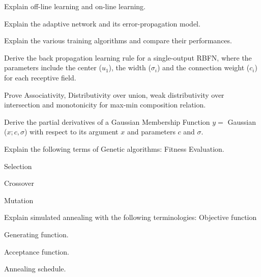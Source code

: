 \newpage \again

\item \iitem Explain off-line learning and on-line learning.
\item Explain the adaptive network and its error-propagation model.
\ene
\ene

\item \iitem Explain the various training algorithms and compare their
  performances.
\Or
\item Derive the back propagation learning rule for a single-output RBFN,
  where the parameters include the center ($u_1$), the width ($\sigma_i$)
  and the connection weight ($c_i$) for each receptive field.
\ene

\item \iitem Prove Associativity, Distributivity over union, weak distributivity
  over intersection and monotonicity for max-min composition relation.
\Or
\item Derive the partial derivatives of a Gaussian Membership Function
  $y =$ Gaussian ($x; c, \sigma$) with respect to its argument $x$ and
  parameters $c$ and $\sigma$.
\ene

\item \iitem Explain the following terms of Genetic algorithms:
\iitem Fitness Evaluation.
\item Selection
\item Crossover
\item Mutation
\ene
\Or
\item Explain simulated annealing with the following terminologies:
\iitem Objective function
\item Generating function.
\item Acceptance function.
\item Annealing schedule.
\ene
\ene

\markC
\ene

